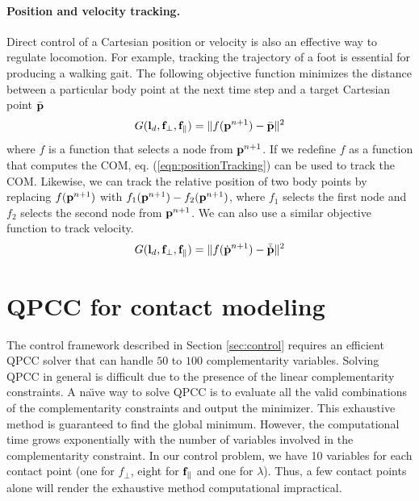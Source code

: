 \paragraph{Position and velocity tracking.}
Direct control of a Cartesian position or velocity is also an effective
way to regulate locomotion. For example, tracking the trajectory of a foot
is essential for producing a walking gait. The following objective function minimizes the distance between a particular body point at the next time step and a target Cartesian point $\bar{\mathbf{p}}$
\begin{equation}
G(\mathbf{l}_d, \mathbf{f}_\perp, \mathbf{f}_\parallel) = \| f(\mathbf{p}^{n+1}) - \bar{\mathbf{p}} \|^2
\label{eqn:positionTracking}
\end{equation}
where $f$ is a function that selects a node from $\mathbf{p}^{n+1}$. If we redefine $f$ as a function that computes the COM, eq. (\ref{eqn:positionTracking}) can be used to track the COM. Likewise, we can track the relative position of two body points by replacing $f(\mathbf{p}^{n+1})$ with $f_1(\mathbf{p}^{n+1}) - f_2(\mathbf{p}^{n+1})$, where $f_1$ selects the first node and $f_2$ selects the second node from $\mathbf{p}^{n+1}$. We can also use a similar objective function to track velocity.
\begin{equation}
G(\mathbf{l}_d, \mathbf{f}_\perp, \mathbf{f}_\parallel) = \| f(\dot{\mathbf{p}}^{n+1}) - \bar{\dot{\mathbf{p}}} \|^2
\label{eqn:velocityTracking}
\end{equation}


\section{QPCC for contact modeling}
\label{sec:QPCC}

The control framework described in Section \ref{sec:control} requires
an efficient QPCC solver that can handle $50$ to $100$ complementarity
variables. Solving QPCC in general is difficult due to the presence of
the linear complementarity constraints. A na\"{\i}ve way to solve QPCC is
to evaluate all the valid combinations of the complementarity
constraints and output the minimizer. This exhaustive method is
guaranteed to find the global minimum. However, the computational time
grows exponentially with the number of variables involved in the
complementarity constraint. In our control problem, we have 10
variables for each contact point (one for $f_\perp$, eight for
$\mathbf{f}_\parallel$ and one for $\lambda$). Thus, a few contact points
alone will render the exhaustive method computational impractical.

